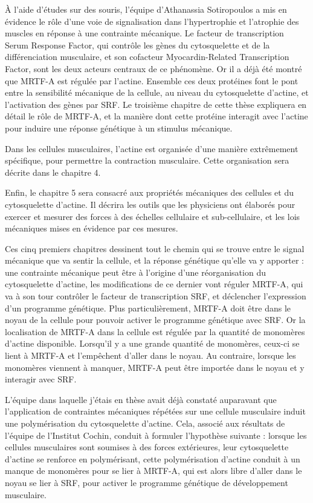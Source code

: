   À l'aide d'études sur des souris, l'équipe d'Athanassia Sotiropoulos a mis en évidence le rôle d'une voie de signalisation dans l'hypertrophie et l'atrophie des muscles en réponse à une contrainte mécanique. Le facteur de transcription Serum Response Factor, qui contrôle les gènes du cytosquelette et de la différenciation musculaire, et son cofacteur Myocardin-Related Transcription Factor, sont les deux acteurs centraux de ce phénomène. Or il a déjà été montré que MRTF-A est régulée par l'actine. Ensemble ces deux protéines font le pont entre la sensibilité mécanique de la cellule, au niveau du cytosquelette d'actine, et l'activation des gènes par SRF. Le troisième chapitre de cette thèse expliquera en détail le rôle de MRTF-A, et la manière dont cette protéine interagit avec l'actine pour induire une réponse génétique à un stimulus mécanique. 
  
  Dans les cellules musculaires, l'actine est organisée d'une manière extrêmement spécifique, pour permettre la contraction musculaire. Cette organisation sera décrite dans le chapitre 4. 
  
  Enfin, le chapitre 5 sera consacré aux propriétés mécaniques des cellules et du cytosquelette d'actine. Il décrira les outils que les physiciens ont élaborés pour exercer et mesurer des forces à des échelles cellulaire et sub-cellulaire, et les lois mécaniques mises en évidence par ces mesures. 
  
  Ces cinq premiers chapitres dessinent tout le chemin qui se trouve entre le signal mécanique que va sentir la cellule, et la réponse génétique qu'elle va y apporter : une contrainte mécanique peut être à l'origine d'une réorganisation du cytosquelette d'actine, les modifications de ce dernier vont réguler MRTF-A, qui va à son tour contrôler le facteur de transcription SRF, et déclencher l'expression d'un programme génétique. Plus particulièrement, MRTF-A doit être dans le noyau de la cellule pour pouvoir activer le programme génétique avec SRF. Or la localisation de MRTF-A dans la cellule est régulée par la quantité de monomères d'actine disponible. Lorsqu'il y a une grande quantité de monomères, ceux-ci se lient à MRTF-A et l'empêchent d'aller dans le noyau. Au contraire, lorsque les monomères viennent à manquer, MRTF-A peut être importée dans le noyau et y interagir avec SRF. 
  
  L'équipe dans laquelle j'étais en thèse avait déjà constaté auparavant que l'application de contraintes mécaniques répétées sur une cellule musculaire induit une polymérisation du cytosquelette d'actine. Cela, associé aux résultats de l'équipe de l'Institut Cochin, conduit à formuler l'hypothèse suivante : lorsque les cellules musculaires sont soumises à des forces extérieures, leur cytosquelette d'actine se renforce en polymérisant, cette polymérisation d'actine conduit à un manque de monomères pour se lier à MRTF-A, qui est alors libre d'aller dans le noyau se lier à SRF, pour activer le programme génétique de développement musculaire. 
  
